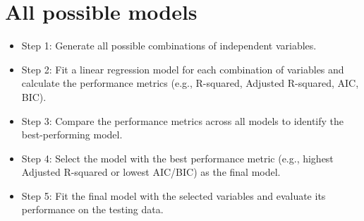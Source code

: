 \documentclass[conference]{IEEEtran}
\begin{document}
\section*{All possible models}
\begin{itemize}
    \item Step 1: Generate all possible combinations of independent variables.
    \item Step 2: Fit a linear regression model for each combination of variables and calculate the performance metrics (e.g., R-squared, Adjusted R-squared, AIC, BIC).
    \item Step 3: Compare the performance metrics across all models to identify the best-performing model.
    \item Step 4: Select the model with the best performance metric (e.g., highest Adjusted R-squared or lowest AIC/BIC) as the final model.
    \item Step 5: Fit the final model with the selected variables and evaluate its performance on the testing data.
\end{itemize}
\end{document}
